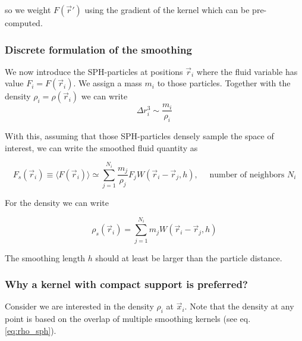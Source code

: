 so we weight $F(\vec{r}')$ using the gradient of the kernel which can be pre-computed.

\subsubsection{Discrete formulation of the smoothing}
We now introduce the SPH-particles at positions $\vec{r}_i$ where the
fluid variable has value $F_i = F(\vec{r}_i)$. We assign a mass $m_i$
to those particles. Together with the density $\rho_i = \rho(\vec{r}_i)$
we can write
\begin{equation}
    \Delta r_i^3 \sim \frac{m_i}{\rho_i}
\end{equation}

With this, assuming that those SPH-particles densely sample the space of interest,
we can write the smoothed fluid quantity as

\begin{equation}
    \label{eq:smoothed_fluid_quantity}
    \boxed{F_s(\vec{r}_i) \equiv\langle F(\vec{r}_i)\rangle \simeq \sum_{j=1}^{N_i} \frac{m_j}{\rho_j} F_j W\left(\vec{r}_i-\vec{r}_j, h\right), \quad \text { number of neighbors } N_i}
\end{equation}



For the density we can write

\begin{equation}
    \label{eq:rho_sph}
    \boxed{\rho_s (\vec{r}_i) = \sum_{j=1}^{N_i} m_j W(\vec{r}_i - \vec{r}_j,h)}
\end{equation}

The smoothing length $h$ should at least be larger than the particle distance.

\subsubsection{Why a kernel with compact support is preferred?}

Consider we are interested in the density $\rho_i$ at $\vec{x}_i$.
Note that the density at any point is based on the overlap of multiple
smoothing kernels (see eq. \ref{eq:rho_sph}).

